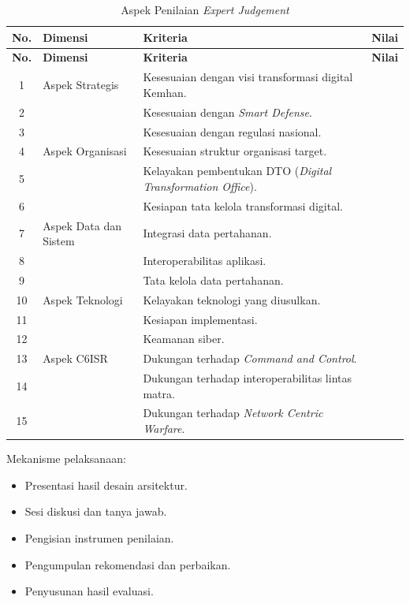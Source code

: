 \begin{longtable}{|c|p{3.2cm}|p{7cm}|c|}
\caption{Aspek Penilaian \textit{Expert Judgement}}
\label{tab:aspek-penilaian} \\
\hline
\textbf{No.} & \textbf{Dimensi} & \textbf{Kriteria} & \textbf{Nilai} \\
\hline
\endfirsthead
\hline
\textbf{No.} & \textbf{Dimensi} & \textbf{Kriteria} & \textbf{Nilai} \\
\hline
\endhead
1 & Aspek Strategis & Kesesuaian dengan visi transformasi digital Kemhan. & \\
\hline
2 & & Kesesuaian dengan \textit{Smart Defense}. & \\
\hline
3 & & Kesesuaian dengan regulasi nasional. & \\
\hline
4 & Aspek Organisasi & Kesesuaian struktur organisasi target. & \\
\hline
5 & & Kelayakan pembentukan DTO (\textit{Digital Transformation Office}). & \\
\hline
6 & & Kesiapan tata kelola transformasi digital. & \\
\hline
7 & Aspek Data dan Sistem & Integrasi data pertahanan. & \\
\hline
8 & & Interoperabilitas aplikasi. & \\
\hline
9 & & Tata kelola data pertahanan. & \\
\hline
10 & Aspek Teknologi & Kelayakan teknologi yang diusulkan. & \\
\hline
11 & & Kesiapan implementasi. & \\
\hline
12 & & Keamanan siber. & \\
\hline
13 & Aspek C6ISR & Dukungan terhadap \textit{Command and Control}. & \\
\hline
14 & & Dukungan terhadap interoperabilitas lintas matra. & \\
\hline
15 & & Dukungan terhadap \textit{Network Centric Warfare}. & \\
\hline
\end{longtable}

Mekanisme pelaksanaan:
\begin{itemize}
  \item Presentasi hasil desain arsitektur.
  \item Sesi diskusi dan tanya jawab.
  \item Pengisian instrumen penilaian.
  \item Pengumpulan rekomendasi dan perbaikan.
  \item Penyusunan hasil evaluasi.
\end{itemize}

